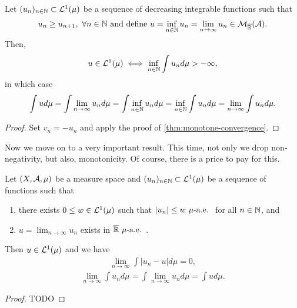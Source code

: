 \begin{cor}
	Let $(u_n)_{n\in\mathbb{N}} \subset \mathcal{L}^1(\mu)$ be a sequence of decreasing integrable functions such that
	\begin{align*}
	u_n \geq u_{n+1},\ \forall n \in \mathbb{N}\text{ and define } u = \inf_{n\in\mathbb{N}} u_n = \lim_{n \to \infty} u_n \in \mathcal{M}_{\overline{\mathbb{R}}}(\mathcal{A}).
	\end{align*}
	Then,
	\begin{align}
	u \in \mathcal{L}^1(\mu) \iff \inf_{n\in\mathbb{N}} \int u_n d\mu > -\infty,
	\end{align}
	in which case
	\begin{align}
	\int u d\mu 
	= \int \lim_{n \to \infty} u_n d\mu
	= \int \inf_{n\in\mathbb{N}} u_n d\mu
	= \inf_{n\in\mathbb{N}} \int u_n d\mu
	= \lim_{n \to \infty} \int u_n d\mu.
	\end{align}
\end{cor}

\begin{proof}
	Set $v_n = -u_n$ and apply the proof of \autoref{thm:monotone-convergence}.
\end{proof}

Now we move on to a very important result. This time, not only we drop non-negativity, but also, monotonicity. Of course, there is a price to pay for this.

\begin{thm}
	\label{thm:lebesgue-dominated-convergence}
	Let $(X, \mathcal{A}, \mu)$ be a measure space and $(u_n)_{n\in\mathbb{N}} \subset \mathcal{L}^1(\mu)$ be a sequence of functions such that
	\begin{enumerate}
		\item there exists $0 \leq w \in \mathcal{L}^1(\mu)$ such that $\left\vert{u_n}\right\vert \leq w \ \mu\text{-a.e. }$ for all $n \in \mathbb{N}$, and
		\item $u = \lim_{n\to\infty} u_n$ exists in ${\overline{\mathbb{R}}}\ \mu\text{-a.e. }$.  
	\end{enumerate}
	
	Then $u \in \mathcal{L}^1(\mu)$ and we have
	\begin{align}
		\lim_{n \to \infty} \int |u_n - u| d\mu = 0,
	\end{align}
	\begin{align}
		\lim_{n \to \infty} \int u_n d\mu = \int \lim_{n \to \infty} u_n d\mu = \int ud\mu.
	\end{align}
\end{thm}

\begin{proof}
	TODO
\end{proof}

